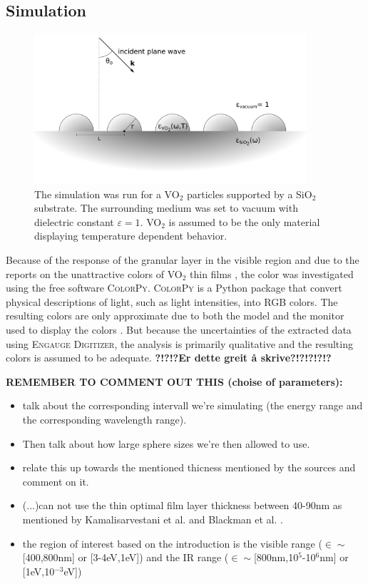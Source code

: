 \subsection{Simulation}
%
\begin{figure}[h!]
    \centering
    \includegraphics[width=0.9\textwidth]{Figures/simulation1.pdf}
    \caption{
       The simulation was run for a VO$_2$ particles supported by a SiO$_2$ substrate. The surrounding
       medium was set to vacuum with dielectric constant $\varepsilon = 1$. VO$_2$ is assumed to
       be the only material displaying temperature dependent behavior.
    }
    \label{fig:simulationFigure}
\end{figure}
%
Because of the response of the granular layer in the visible region and due to the reports on the
unattractive colors of VO$_2$ thin films \cite{Blackman2009}, the color was investigated
using the free software \textsc{ColorPy}. \textsc{ColorPy} is a Python package that convert physical
descriptions of light, such as light intensities, into RGB colors. The resulting colors are only approximate
due to both the model and the monitor used to display the colors \cite{colorpy}. 
But because the uncertainties of the
extracted data using \textsc{Engauge Digitizer}, the analysis is primarily qualitative and the
resulting colors is assumed to be adequate. \textbf{?!?!?Er dette greit å skrive?!?!?!?!?}

\textbf{REMEMBER TO COMMENT OUT THIS (choise of parameters):}
\begin{itemize}
   \item talk about the corresponding intervall we're simulating (the energy range and the corresponding
      wavelength range).
   \item Then talk about how large sphere sizes we're then allowed to use.
   \item relate this up towards the mentioned thicness mentioned by the sources and comment on it.
   \item (...)can not use the thin optimal film layer thickness between 40-90nm as mentioned by 
      Kamalisarvestani et al. \cite{Kamalisarvestani2013} and Blackman et al. \cite{Blackman2009}.
   \item the region of interest based on the introduction is the visible range ($\in \sim $[400,800nm] 
      or [3-4eV,1eV]) and the IR range ($\in \sim $[800nm,10$^5$-10$^6$nm] or [1eV,10$^{-3}$eV]) 
      \cite[p.~11]{Smith}
\end{itemize}

